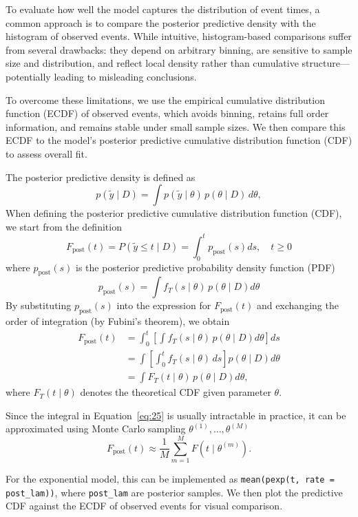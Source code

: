 To evaluate how well the model captures the distribution of event times, a common approach is to compare the posterior predictive density with the histogram of observed events. While intuitive, histogram-based comparisons suffer from several drawbacks: they depend on arbitrary binning, are sensitive to sample size and distribution, and reflect local density rather than cumulative structure—potentially leading to misleading conclusions.

To overcome these limitations, we use the empirical cumulative distribution function (ECDF) of observed events, which avoids binning, retains full order information, and remains stable under small sample sizes. We then compare this ECDF to the model’s posterior predictive cumulative distribution function (CDF) to assess overall fit.

The posterior predictive density is defined as
\begin{equation}
    p(\tilde{y} \mid D) = \int p(\tilde{y} \mid \theta) \, p(\theta \mid D) \, d\theta,
\end{equation}
When defining the posterior predictive cumulative distribution function (CDF), we start from the definition
\begin{equation}
F_{\text{post}}(t)
= P(\tilde{y} \le t \mid D)
= \int_0^{t} p_{\text{post}}(s) ds, \quad t\ge 0
\end{equation}
where $p_{\text{post}}(s)$ is the posterior predictive probability density function (PDF)
\begin{equation}
p_{\text{post}}(s)
= \int f_T(s\mid\theta)\,p(\theta \mid D) d\theta
\end{equation}
By substituting $p_{\text{post}}(s)$ into the expression for $F_{\text{post}}(t)$ and exchanging the order of integration (by Fubini's theorem), we obtain
\begin{align}
F_{\text{post}}(t)
&= \int_0^{t} 
\left[ \int f_T(s\mid\theta)\,p(\theta \mid D) d\theta \right] ds \\[6pt]
&= \int \left[ \int_0^{t} f_T(s\mid\theta)\, ds \right] p(\theta \mid D) d\theta \\[6pt]
&= \int F_T(t\mid\theta)\, p(\theta \mid D) d\theta,
\label{eq:25}
\end{align}
where $F_T(t\mid\theta)$ denotes the theoretical CDF given parameter $\theta$.

Since the integral in Equation~\eqref{eq:25} is usually intractable in practice, it can be approximated using Monte Carlo sampling $\theta^{(1)}, \dots, \theta^{(M)}$
\begin{equation}
    F_{\text{post}}(t) \approx \frac{1}{M} \sum_{m=1}^M F(t \mid \theta^{(m)}).
\end{equation}

For the exponential model, this can be implemented as \texttt{mean(pexp(t, rate = post\_lam))}, where \texttt{post\_lam} are posterior samples. We then plot the predictive CDF against the ECDF of observed events for visual comparison.






